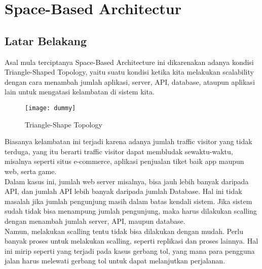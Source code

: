 %
\chapter{Space-Based Architectur}
\section{{Latar Belakang}}
 Asal mula terciptanya Space-Based Architecture ini dikarenakan adanya kondisi Triangle-Shaped Topology, yaitu suatu kondisi ketika kita melakukan scalability dengan cara menambah jumlah aplikasi, server, API, database, ataupun aplikasi lain untuk mengatasi kelambatan di sistem kita.\\
\vskip0.15cm
\begin{figure}
	\centering
	\texttt{[image: dummy]}
	\caption{Triangle-Shape Topology}
\end{figure}
\vskip0.15cm
Biasanya kelambatan ini terjadi karena adanya jumlah traffic visitor yang tidak terduga, yang itu berarti traffic visitor dapat membludak sewaktu-waktu, misalnya seperti situs e-commerce, aplikasi penjualan tiket baik app maupun web, serta game.\\

Dalam kasus ini, jumlah web server misalnya, bisa jauh lebih banyak daripada API, dan jumlah API lebih banyak daripada jumlah Database. Hal ini tidak masalah jika jumlah pengunjung masih dalam batas kendali sistem. Jika sistem sudah tidak bisa menampung jumlah pengunjung, maka harus dilakukan scalling dengan menambah jumlah server, API, maupun database.\\

Namun, melakukan scalling tentu tidak bisa dilakukan dengan mudah. Perlu banyak proses untuk melakukan scalling, seperti replikasi dan proses lainnya. Hal ini mirip seperti yang terjadi pada kasus gerbang tol, yang mana para pengguna jalan harus melewati gerbang tol untuk dapat melanjutkan perjalanan.\\

